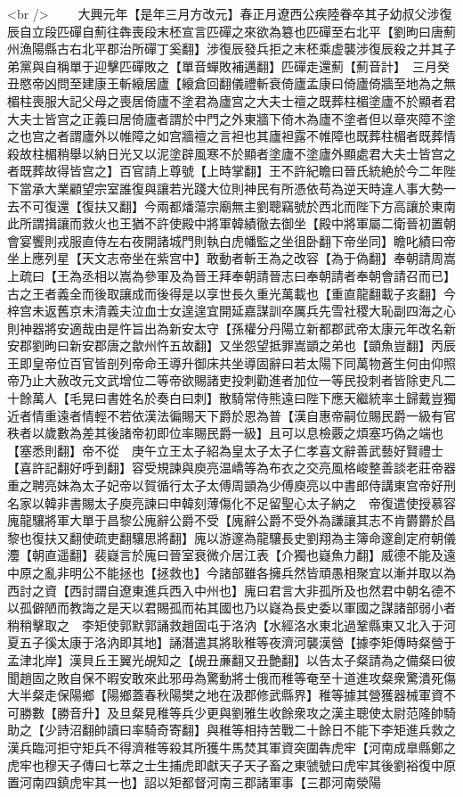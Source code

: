 <br />
　　大興元年【是年三月方改元】春正月遼西公疾陸眷卒其子幼叔父涉復辰自立段匹磾自薊往犇喪段末柸宣言匹磾之來欲為簒也匹磾至右北平【劉昫曰唐薊州漁陽縣古右北平郡治所磾丁奚翻】涉復辰發兵拒之末柸乘虚襲涉復辰殺之并其子弟黨與自稱單于迎擊匹磾敗之【單音蟬敗補邁翻】匹磾走還薊【薊音計】　三月癸丑愍帝凶問至建康王斬縗居廬【縗倉回翻儀禮斬衰倚廬孟康曰倚廬倚牆至地為之無楣柱喪服大記父母之喪居倚廬不塗君為廬宫之大夫士䄠之既葬柱楣塗廬不於顯者君大夫士皆宫之正義曰居倚廬者謂於中門之外東牆下倚木為廬不塗者但以章夾障不塗之也宫之者謂廬外以帷障之如宫牆䄠之言袒也其廬袒露不帷障也既葬柱楣者既葬情殺故柱楣稍舉以納日光又以泥塗辟風寒不於顯者塗廬不塗廬外顯處君大夫士皆宫之者既葬故得皆宫之】百官請上尊號【上時掌翻】王不許紀瞻曰晉氏統絶於今二年陛下當承大業顧望宗室誰復與讓若光踐大位則神民有所憑依苟為逆天時違人事大勢一去不可復還【復扶又翻】今兩都燔蕩宗廟無主劉聰竊號於西北而陛下方高讓於東南此所謂揖讓而救火也王猶不許使殿中將軍韓績徹去御坐【殿中將軍屬二衛晉初置朝會宴饗則戎服直侍左右夜開諸城門則執白虎幡監之坐徂卧翻下帝坐同】瞻叱績曰帝坐上應列星【天文志帝坐在紫宫中】敢動者斬王為之改容【為于偽翻】奉朝請周嵩上疏曰【王為丞相以嵩為參軍及為晉王拜奉朝請晉志曰奉朝請者奉朝會請召而已】古之王者義全而後取讓成而後得是以享世長久重光萬載也【重直龍翻載子亥翻】今梓宫未返舊京未清義夫泣血士女遑遑宜開延嘉謀訓卒厲兵先雪社稷大恥副四海之心則神器將安適哉由是忤旨出為新安太守【孫權分丹陽立新都郡武帝太康元年改名新安郡劉昫曰新安郡唐之歙州忤五故翻】又坐怨望抵罪嵩顗之弟也【顗魚豈翻】丙辰王即皇帝位百官皆剖列帝命王導升御床共坐導固辭曰若太陽下同萬物蒼生何由仰照帝乃止大赦改元文武增位二等帝欲賜諸吏投刺勸進者加位一等民投刺者皆除吏凡二十餘萬人【毛晃曰書姓名於奏白曰刺】散騎常侍熊遠曰陛下應天繼統率土歸戴豈獨近者情重遠者情輕不若依漢法徧賜天下爵於恩為普【漢自惠帝嗣位賜民爵一級有官秩者以歲數為差其後諸帝初即位率賜民爵一級】且可以息檢覈之煩塞巧偽之端也【塞悉則翻】帝不從　庚午立王太子紹為皇太子太子仁孝喜文辭善武藝好賢禮士【喜許記翻好呼到翻】容受規諫與庾亮温嶠等為布衣之交亮風格峻整善談老莊帝器重之聘亮妹為太子妃帝以賀循行太子太傅周顗為少傅庾亮以中書郎侍講東宫帝好刑名家以韓非書賜太子庾亮諫曰申韓刻薄傷化不足留聖心太子納之　帝復遣使授慕容廆龍驤將軍大單于昌黎公廆辭公爵不受【廆辭公爵不受外為謙讓其志不肯欝欝於昌黎也復扶又翻使疏吏翻驤思將翻】廆以游邃為龍驤長史劉翔為主簿命邃創定府朝儀灋【朝直遥翻】裴嶷言於廆曰晉室衰微介居江表【介獨也嶷魚力翻】威德不能及遠中原之亂非明公不能拯也【拯救也】今諸部雖各擁兵然皆頑愚相聚宜以漸并取以為西討之資【西討謂自遼東進兵西入中州也】廆曰君言大非孤所及也然君中朝名德不以孤僻陋而教誨之是天以君賜孤而祐其國也乃以嶷為長史委以軍國之謀諸部弱小者稍稍擊取之　李矩使郭默郭誦救趙固屯于洛汭【水經洛水東北過鞏縣東又北入于河夏五子徯太康于洛汭即其地】誦潛遣其將耿稚等夜濟河襲漢營【據李矩傳時粲營于孟津北岸】漢貝丘王翼光覘知之【覘丑亷翻又丑艶翻】以告太子粲請為之備粲曰彼聞趙固之敗自保不暇安敢來此邪毋為驚動將士俄而稚等奄至十道進攻粲衆驚潰死傷大半粲走保陽鄉【陽鄉蓋春秋陽樊之地在汲郡修武縣界】稚等據其營獲器械軍資不可勝數【勝音升】及旦粲見稚等兵少更與劉雅生收餘衆攻之漢主聰使太尉范隆帥騎助之【少詩沼翻帥讀曰率騎奇寄翻】與稚等相持苦戰二十餘日不能下李矩進兵救之漢兵臨河拒守矩兵不得濟稚等殺其所獲牛馬焚其軍資突圍犇虎牢【河南成臯縣鄭之虎牢也穆天子傳曰七萃之士生捕虎即獻天子天子畜之東虢號曰虎牢其後劉裕復中原置河南四鎮虎牢其一也】詔以矩都督河南三郡諸軍事【三郡河南滎陽